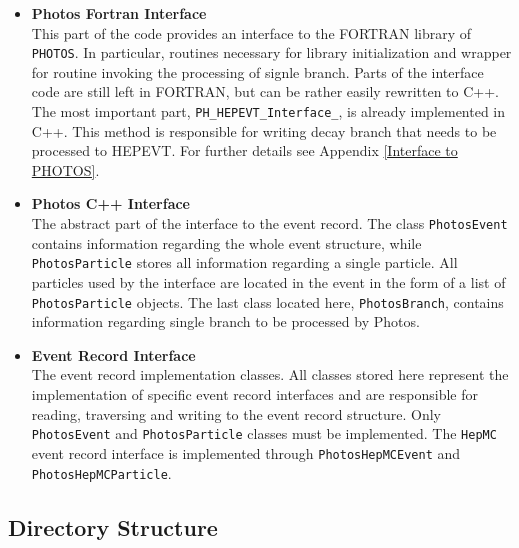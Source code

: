 \documentclass[]{Photos_interface_design}
\begin{document}
\begin{itemize}
  \item {\bf Photos Fortran Interface}\\
       This part of the code provides an interface 
       to the FORTRAN library of {\tt PHOTOS}. In particular,  routines
       necessary for library initialization and wrapper for routine invoking the processing
	   of signle branch. Parts of the interface code are still left in FORTRAN, but
	   can be rather easily rewritten to C++. 
       The most important part, {\tt PH\_HEPEVT\_Interface\_},
       is already implemented  in C++. This method is responsible for writing
	   decay branch that needs to be processed to HEPEVT.
       For further details see Appendix \ref{Interface to PHOTOS}.
  \item {\bf Photos C++ Interface} \\
       The abstract part of the interface to the event record.
       The class {\tt PhotosEvent} contains information regarding the whole event
       structure, while {\tt PhotosParticle} stores all information regarding a single particle.
       All particles used by the interface are located in the event in the form of
       a list of {\tt PhotosParticle} objects.
       The last class located here, {\tt PhotosBranch}, contains information regarding
	   single branch to be processed by Photos.
  \item {\bf Event Record Interface} \\
       The event record implementation classes. All classes stored here represent
       the implementation of specific event record interfaces and are responsible for reading,
       traversing and writing to the event record structure.
       Only {\tt PhotosEvent} and {\tt PhotosParticle} classes must be implemented.
       The {\tt HepMC} event record interface is implemented
       through {\tt PhotosHepMCEvent} and {\tt PhotosHepMCParticle}.
\end{itemize}

\subsection{Directory Structure}
\end{document}
